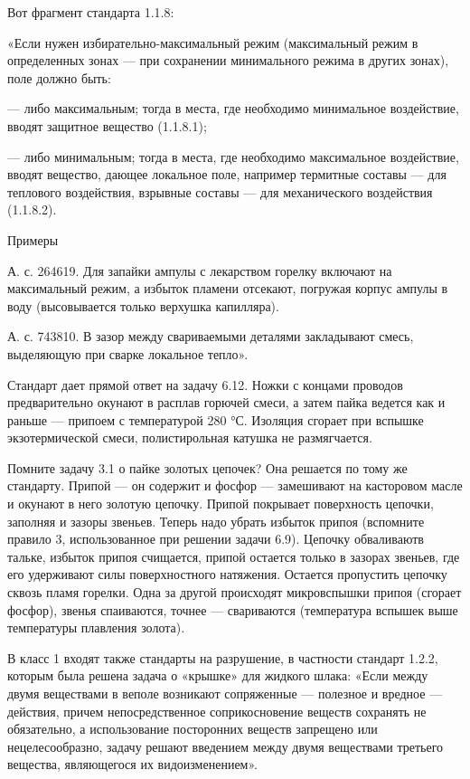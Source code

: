 Вот фрагмент стандарта 1.1.8:

«Если  нужен  избирательно-максимальный  режим (максимальный  режим  в
определенных  зонах  — при  сохранении  минимального  режима в  других
зонах), поле должно быть:

—  либо  максимальным;  тогда  в  места,  где  необходимо  минимальное
воздействие, вводят защитное вещество (1.1.8.1);

—  либо  минимальным;  тогда  в  места,  где  необходимо  максимальное
воздействие,   вводят  вещество,   дающее  локальное   поле,  например
термитные составы — для теплового  воздействия, взрывные составы — для
механического воздействия (1.1.8.2).



Примеры


А.  с. 264619.  Для запайки  ампулы с  лекарством горелку  включают на
максимальный режим, а избыток пламени отсекают, погружая корпус ампулы
в воду (высовывается только верхушка капилляра).

А. с. 743810.  В зазор между свариваемыми  деталями закладывают смесь,
выделяющую при сварке локальное тепло».

Стандарт дает  прямой ответ на  задачу 6.12. Ножки с  концами проводов
предварительно окунают в расплав горючей  смеси, а затем пайка ведется
как и  раньше — припоем  с температурой  280 °С. Изоляция  сгорает при
вспышке экзотермической смеси, полистирольная катушка не размягчается.

Помните задачу  3.1 о пайке золотых  цепочек? Она решается по  тому же
стандарту. Припой  — он содержит  и фосфор — замешивают  на касторовом
масле и окунают  в него золотую цепочку.  Припой покрывает поверхность
цепочки, заполняя и зазоры звеньев.  Теперь надо убрать избыток припоя
(вспомните правило 3, использованное  при решении задачи 6.9). Цепочку
обваливаютв тальке, избыток припоя счищается, припой остается только в
зазорах  звеньев, где  его удерживают  силы поверхностного  натяжения.
Остается  пропустить  цепочку сквозь  пламя  горелки.  Одна за  другой
происходят  микровспышки припоя  (сгорает фосфор),  звенья спаиваются,
точнее —  свариваются (температура вспышек выше  температуры плавления
золота).

В класс 1  входят также стандарты на разрушение,  в частности стандарт
1.2.2,  которым  была решена  задача  о  «крышке» для  жидкого  шлака:
«Если  между  двумя  веществами   в  веполе  возникают  сопряженные  —
полезное и вредное — действия, причем непосредственное соприкосновение
веществ сохранять не обязательно,  а использование посторонних веществ
запрещено  или нецелесообразно,  задачу решают  введением между  двумя
веществами третьего вещества, являющегося их видоизменением».

